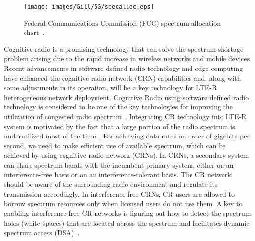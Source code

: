 \begin{figure}[!ht]
	\centering
\texttt{[image: images/Gill/5G/specalloc.eps]}
	\caption{Federal Communications Commission (FCC) spectrum allocation chart~\cite{fcc}.}
	\label{specalloc}
\end{figure}

Cognitive radio is a promising technology that can solve the spectrum shortage problem arising due to the rapid increase in wireless networks and mobile devices. Recent advancements in software-defined radio technology and edge computing have enhanced the cognitive radio network (CRN)  capabilities and, along with some adjustments in its operation, will be a key technology for LTE-R heterogeneous network deployment. Cognitive Radio using software defined radio technology is considered to be one of the key technologies for improving the utilization of congested radio spectrum~\cite{rusek2013scaling}. Integrating CR technology into LTE-R system is motivated by the fact that a large portion of the radio spectrum is underutilized most of the time~\cite{7553613}. For achieving data rates on order of gigabits per second, we need to make efficient use of available spectrum, which can be achieved by using cognitive radio network (CRNs). In CRNs, a secondary system can share spectrum bands with the incumbent primary system, either on an interference-free basis or on an interference-tolerant basis. The CR network should be aware of
the surrounding radio environment and regulate its transmission accordingly. In interference-free CRNs, CR users are allowed to borrow spectrum resources only when licensed users do not use them. A key to enabling interference-free CR networks is figuring out how to detect the spectrum holes (white spaces) that are located across the spectrum and facilitates dynamic spectrum access (DSA)~\cite{wyglinski2009cognitive}.


